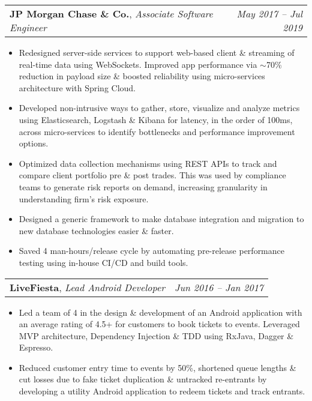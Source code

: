 \documentclass[letterpaper,10pt]{article}
\makeatletter
\newcommand{\resumeItem}[2]{
	\item\normalsize{
		\textbf{#1}{: #2}
	}\vspace{-2pt}
}
\newcommand{\resumeSubheading}[4]{
	\vspace{2pt}\item[]
	\begin{tabular*}{\textwidth}[t]{l@{\extracolsep{\fill}}r}
		\textbf{#1}, \textit{\small#3} \textit{\small#2} & \textit{\small #4} \\
	\end{tabular*}\vspace{-2pt}
}
\newcommand{\resumeSubHeadingListStart}{\begin{itemize}[label=$\circ$,leftmargin=\hoffset]}
\newcommand{\resumeSubHeadingListEnd}{\end{itemize}}
\makeatother
\begin{document}
	\resumeSubheading
	{JP Morgan Chase \& Co.}{}
	{Associate Software Engineer}{May 2017 -- Jul 2019}
	\resumeSubHeadingListStart
	\item{Redesigned server-side services to support web-based client \& streaming of real-time data using WebSockets. Improved app performance via $\sim$70\%  reduction in payload size \& boosted reliability using micro-services architecture with Spring Cloud.}
	\item{Developed non-intrusive ways to gather, store, visualize and analyze metrics using Elasticsearch, Logstash \& Kibana for latency, in the order of 100ms, across micro-services to identify bottlenecks and performance improvement options.}
	\item{Optimized data collection mechanisms using REST APIs to track and compare client portfolio pre \& post trades. This was used by compliance teams to generate risk reports on demand, increasing granularity in understanding firm's risk exposure.}
	\item{Designed a generic framework to make database integration and migration to new database technologies easier \& faster.}
	\item{Saved 4 man-hours/release cycle by automating pre-release performance testing using in-house CI/CD and build tools.}
	\vspace{-2mm}
	\resumeSubHeadingListEnd
	
	\resumeSubheading
	{LiveFiesta}{}
	{Lead Android Developer}{Jun 2016 -- Jan 2017}
	\resumeSubHeadingListStart
	\item
	{Led a team of 4 in the design \& development of an Android application with an average rating of 4.5+ for customers to book tickets to events. Leveraged MVP architecture, Dependency Injection \& TDD using RxJava, Dagger \& Espresso.} %
	\item{Reduced customer entry time to events by 50\%, shortened queue lengths \& cut losses due to fake ticket duplication \& untracked re-entrants by developing a utility Android application to redeem tickets and track entrants.} 
	\vspace{-2mm}
	\resumeSubHeadingListEnd
	
\end{document}
